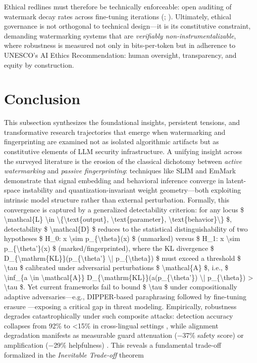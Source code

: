 \documentclass[11pt,a4paper]{article}
\begin{document}
Ethical redlines must therefore be technically enforceable: open auditing of watermark decay rates across fine-tuning iterations (\cite{arxiv:2506.23731}; \cite{arxiv:2407.10887}). Ultimately, ethical governance is not orthogonal to technical design---it is its constitutive constraint, demanding watermarking systems that are \emph{verifiably non-instrumentalizable}, where robustness is measured not only in bits-per-token but in adherence to UNESCO's AI Ethics Recommendation: human oversight, transparency, and equity by construction.


\section{Conclusion}


This subsection synthesizes the foundational insights, persistent tensions, and transformative research trajectories that emerge when watermarking and fingerprinting are examined not as isolated algorithmic artifacts but as constitutive elements of LLM security infrastructure. A unifying insight across the surveyed literature is the erosion of the classical dichotomy between \emph{active watermarking} and \emph{passive fingerprinting}: techniques like SLIM \cite{arxiv:2601.03242} and EmMark \cite{doi:10.1145/3649329.3655674} demonstrate that signal embedding and behavioral inference converge in latent-space instability and quantization-invariant weight geometry---both exploiting intrinsic model structure rather than external perturbation. Formally, this convergence is captured by a generalized detectability criterion: for any locus \$ \textbackslash{}mathcal\{L\} \textbackslash{}in \textbackslash{}\{\textbackslash{}text\{output\}, \textbackslash{}text\{parameter\}, \textbackslash{}text\{behavior\}\textbackslash{}\} \$, detectability \$ \textbackslash{}mathcal\{D\} \$ reduces to the statistical distinguishability of two hypotheses \$ H\_0: x \textbackslash{}sim p\_\{\textbackslash{}theta\}(x) \$ (unmarked) versus \$ H\_1: x \textbackslash{}sim p\_\{\textbackslash{}theta'\}(x) \$ (marked/fingerprinted), where the KL divergence \$ D\_\{\textbackslash{}mathrm\{KL\}\}(p\_\{\textbackslash{}theta'\} \textbackslash{}| p\_\{\textbackslash{}theta\}) \$ must exceed a threshold \$ \textbackslash{}tau \$ calibrated under adversarial perturbations \$ \textbackslash{}mathcal\{A\} \$, i.e., \$ \textbackslash{}inf\_\{a \textbackslash{}in \textbackslash{}mathcal\{A\}\} D\_\{\textbackslash{}mathrm\{KL\}\}(a(p\_\{\textbackslash{}theta'\}) \textbackslash{}| p\_\{\textbackslash{}theta\}) > \textbackslash{}tau \$. Yet current frameworks fail to bound \$ \textbackslash{}tau \$ under compositionally adaptive adversaries---e.g., DIPPER-based paraphrasing followed by fine-tuning erasure \cite{arxiv:2303.13408}---exposing a critical gap in threat modeling. Empirically, robustness degrades catastrophically under such composite attacks: detection accuracy collapses from 92\% to <15\% in cross-lingual settings \cite{arxiv:2303.13408}, while alignment degradation manifests as measurable guard attenuation ($-$37\% safety score) or amplification ($-$29\% helpfulness) \cite{arxiv:2306.11698}. This reveals a fundamental trade-off formalized in the \emph{Inevitable Trade-off} theorem 
\end{document}
